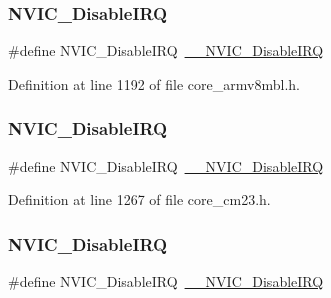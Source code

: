\subsubsection{\texorpdfstring{N\+V\+I\+C\+\_\+\+Disable\+I\+RQ}{NVIC\_DisableIRQ}\hspace{0.1cm}{\footnotesize\ttfamily [5/13]}}
{\footnotesize\ttfamily \#define N\+V\+I\+C\+\_\+\+Disable\+I\+RQ~\hyperlink{group___c_m_s_i_s___core___n_v_i_c_functions_gae016e4c1986312044ee768806537d52f}{\+\_\+\+\_\+\+N\+V\+I\+C\+\_\+\+Disable\+I\+RQ}}



Definition at line 1192 of file core\+\_\+armv8mbl.\+h.

\mbox{\label{group___c_m_s_i_s___core___n_v_i_c_functions_ga73b4e251f59cab4e9a5e234aac02ae57}} 
\subsubsection{\texorpdfstring{N\+V\+I\+C\+\_\+\+Disable\+I\+RQ}{NVIC\_DisableIRQ}\hspace{0.1cm}{\footnotesize\ttfamily [6/13]}}
{\footnotesize\ttfamily \#define N\+V\+I\+C\+\_\+\+Disable\+I\+RQ~\hyperlink{group___c_m_s_i_s___core___n_v_i_c_functions_gae016e4c1986312044ee768806537d52f}{\+\_\+\+\_\+\+N\+V\+I\+C\+\_\+\+Disable\+I\+RQ}}



Definition at line 1267 of file core\+\_\+cm23.\+h.

\mbox{\label{group___c_m_s_i_s___core___n_v_i_c_functions_ga73b4e251f59cab4e9a5e234aac02ae57}} 
\subsubsection{\texorpdfstring{N\+V\+I\+C\+\_\+\+Disable\+I\+RQ}{NVIC\_DisableIRQ}\hspace{0.1cm}{\footnotesize\ttfamily [7/13]}}
{\footnotesize\ttfamily \#define N\+V\+I\+C\+\_\+\+Disable\+I\+RQ~\hyperlink{group___c_m_s_i_s___core___n_v_i_c_functions_gae016e4c1986312044ee768806537d52f}{\+\_\+\+\_\+\+N\+V\+I\+C\+\_\+\+Disable\+I\+RQ}}



